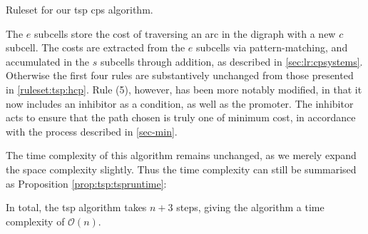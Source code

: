 \begin{cprulesetfloat}
    \begin{cpruleset}
        
        
        
        
        
        
    \end{cpruleset}
    \caption[Ruleset for the ]{\label{ruleset:tsp:tsp}Ruleset for our \gls{tsp} \gls{cps} algorithm.}
\end{cprulesetfloat}

The \(e\) subcells store the cost of traversing an arc in the digraph with a new \(c\) subcell.  The costs are extracted from the \(e\) subcells via pattern-matching, and accumulated in the \(s\) subcells through addition, as described in \autoref{sec:lr:cpsystems}. Otherwise the first four rules are substantively unchanged from those presented in \autoref{ruleset:tsp:hcp}.  Rule (5), however, has been more notably modified, in that it now includes an inhibitor as a condition, as well as the promoter.  The inhibitor acts to ensure that the path chosen is truly one of minimum cost, in accordance with the process described in \autoref{sec-min}.

The time complexity of this algorithm remains unchanged, as we merely expand the space complexity slightly.  Thus the time complexity can still be summarised as Proposition \ref{prop:tsp:tspruntime}:

\begin{proposition}
In total, the \gls{tsp} algorithm takes \(n + 3\) steps, giving the algorithm a time complexity of \(\mathcal{O}(n)\).
\label{prop:tsp:tspruntime}
\end{proposition}